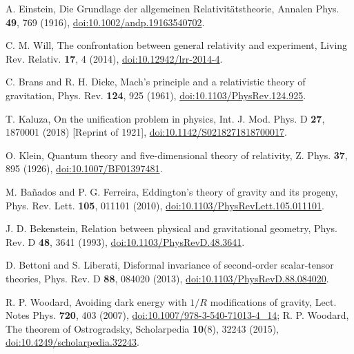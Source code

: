 \documentclass{article}
\begin{document}
\begin{thebibliography}{99}

A. Einstein, Die Grundlage der allgemeinen Relativitätstheorie, 
Annalen Phys. \textbf{49}, 769 (1916), 
\href{https://doi.org/10.1002/andp.19163540702}{doi:10.1002/andp.19163540702}.

C. M. Will, The confrontation between general relativity and experiment, 
Living Rev. Relativ. \textbf{17}, 4 (2014),
\href{https://doi.org/10.12942/lrr-2014-4}{doi:10.12942/lrr-2014-4}.

C. Brans and R. H. Dicke, Mach’s principle and a relativistic theory of gravitation, 
Phys. Rev. \textbf{124}, 925 (1961),
\href{https://doi.org/10.1103/PhysRev.124.925}{doi:10.1103/PhysRev.124.925}.

T. Kaluza, On the unification problem in physics, 
Int. J. Mod. Phys. D \textbf{27}, 1870001 (2018) [Reprint of 1921],
\href{https://doi.org/10.1142/S0218271818700017}{doi:10.1142/S0218271818700017}.

O. Klein, Quantum theory and five-dimensional theory of relativity, 
Z. Phys. \textbf{37}, 895 (1926),
\href{https://doi.org/10.1007/BF01397481}{doi:10.1007/BF01397481}.

M. Ba\~nados and P. G. Ferreira, Eddington’s theory of gravity and its progeny, 
Phys. Rev. Lett. \textbf{105}, 011101 (2010),
\href{https://doi.org/10.1103/PhysRevLett.105.011101}{doi:10.1103/PhysRevLett.105.011101}.

J. D. Bekenstein, Relation between physical and gravitational geometry, 
Phys. Rev. D \textbf{48}, 3641 (1993),
\href{https://doi.org/10.1103/PhysRevD.48.3641}{doi:10.1103/PhysRevD.48.3641}.

D. Bettoni and S. Liberati, Disformal invariance of second-order scalar-tensor theories, 
Phys. Rev. D \textbf{88}, 084020 (2013),
\href{https://doi.org/10.1103/PhysRevD.88.084020}{doi:10.1103/PhysRevD.88.084020}.

R. P. Woodard, Avoiding dark energy with $1/R$ modifications of gravity, 
Lect. Notes Phys. \textbf{720}, 403 (2007),
\href{https://doi.org/10.1007/978-3-540-71013-4_14}{doi:10.1007/978-3-540-71013-4\_14}; 
R. P. Woodard, The theorem of Ostrogradsky, 
Scholarpedia \textbf{10}(8), 32243 (2015),
\href{https://doi.org/10.4249/scholarpedia.32243}{doi:10.4249/scholarpedia.32243}.


\end{thebibliography}
\end{document}
